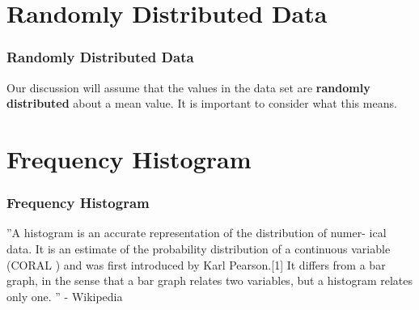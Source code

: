 \documentclass[fleqn]{beamer} %
\newcommand{\sectiontitleII}{Randomly Distributed Data}
\newcommand{\sectiontitleIII}{Frequency Histogram}
\begin{document}
\section{\sectiontitleII}	
	\begin{frame}[label=sectionII] \small
		\frametitle{\sectiontitleII}    
		
				
		Our discussion will assume that the values in the data set are {\bf \PN randomly distributed } about a mean value. It is important to consider what this means.
		

	\end{frame}


\section{\sectiontitleIII}	
	\begin{frame}[label=sectionIII] \small
		\frametitle{\sectiontitleIII}    

		”A {\GR histogram} is an accurate representation of the distribution of numer-
ical data. It is an estimate of the probability distribution of a continuous
variable (CORAL ) and was first introduced by Karl Pearson.[1] It differs
from a bar graph, in the sense that a bar graph relates two variables, but a
histogram relates only one. ” - Wikipedia

	\end{frame}
	
\end{document}
